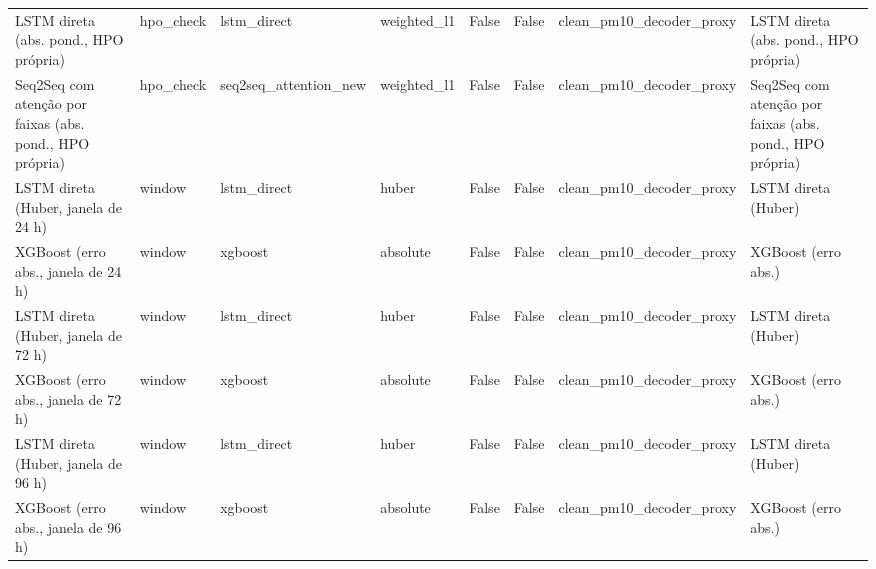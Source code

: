\begin{table}[!htbp]
\begin{adjustbox}{max width=\textwidth}
\begin{tabular}{>{\raggedright\arraybackslash}p{}lllrrl>{\raggedright\arraybackslash}p{}}
        LSTM direta (abs. pond., HPO própria) & hpo\_check & lstm\_direct & weighted\_l1 & False & False & clean\_pm10\_decoder\_proxy & LSTM direta (abs. pond., HPO própria) \\
        Seq2Seq com atenção por faixas (abs. pond., HPO própria) & hpo\_check & seq2seq\_attention\_new & weighted\_l1 & False & False & clean\_pm10\_decoder\_proxy & Seq2Seq com atenção por faixas (abs. pond., HPO própria) \\
        LSTM direta (Huber, janela de 24 h) & window & lstm\_direct & huber & False & False & clean\_pm10\_decoder\_proxy & LSTM direta (Huber) \\
        XGBoost (erro abs., janela de 24 h) & window & xgboost & absolute & False & False & clean\_pm10\_decoder\_proxy & XGBoost (erro abs.) \\
        LSTM direta (Huber, janela de 72 h) & window & lstm\_direct & huber & False & False & clean\_pm10\_decoder\_proxy & LSTM direta (Huber) \\
        XGBoost (erro abs., janela de 72 h) & window & xgboost & absolute & False & False & clean\_pm10\_decoder\_proxy & XGBoost (erro abs.) \\
        LSTM direta (Huber, janela de 96 h) & window & lstm\_direct & huber & False & False & clean\_pm10\_decoder\_proxy & LSTM direta (Huber) \\
        XGBoost (erro abs., janela de 96 h) & window & xgboost & absolute & False & False & clean\_pm10\_decoder\_proxy & XGBoost (erro abs.) \\
        \bottomrule
    \end{tabular}
    \end{adjustbox}
\end{table}
